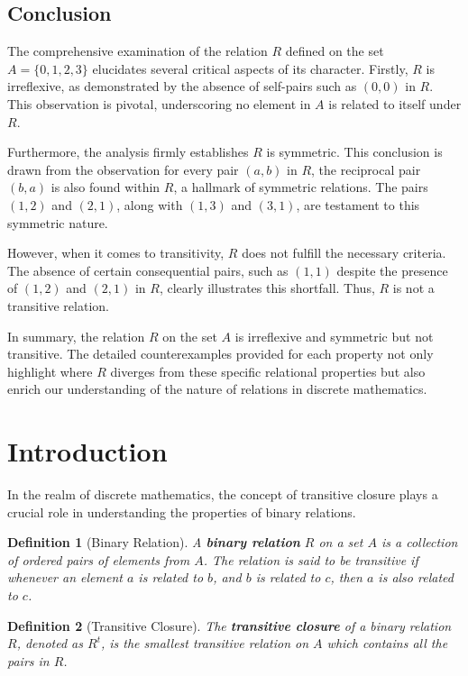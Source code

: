 \documentclass[12pt]{article}
\newtheorem{definition}{Definition}
\begin{document}
\subsection{Conclusion}
The comprehensive examination of the relation \( R \) defined on the set \( A = \{ 0, 1, 2, 3 \} \) elucidates several critical aspects of its character. Firstly, \( R \) is irreflexive, as demonstrated by the absence of self-pairs such as \( (0,0) \) in \( R \). This observation is pivotal, underscoring no element in \( A \) is related to itself under \( R \).

Furthermore, the analysis firmly establishes \( R \) is symmetric. This conclusion is drawn from the observation for every pair \( (a, b) \) in \( R \), the reciprocal pair \( (b, a) \) is also found within \( R \), a hallmark of symmetric relations. The pairs \( (1,2) \) and \( (2,1) \), along with \( (1,3) \) and \( (3,1) \), are testament to this symmetric nature.

However, when it comes to transitivity, \( R \) does not fulfill the necessary criteria. The absence of certain consequential pairs, such as \( (1,1) \) despite the presence of \( (1,2) \) and \( (2,1) \) in \( R \), clearly illustrates this shortfall. Thus, \( R \) is not a transitive relation.

In summary, the relation \( R \) on the set \( A \) is irreflexive and symmetric but not transitive. The detailed counterexamples provided for each property not only highlight where \( R \) diverges from these specific relational properties but also enrich our understanding of the nature of relations in discrete mathematics.


\section{Introduction}
In the realm of discrete mathematics, the concept of transitive closure plays a crucial role in understanding the properties of binary relations. 

\begin{definition}[Binary Relation]
A \textbf{binary relation} \( R \) on a set \( A \) is a collection of ordered pairs of elements from \( A \). The relation is said to be \textit{transitive} if whenever an element \( a \) is related to \( b \), and \( b \) is related to \( c \), then \( a \) is also related to \( c \).
\end{definition}

\begin{definition}[Transitive Closure]
The \textbf{transitive closure} of a binary relation \( R \), denoted as \( R^t \), is the smallest transitive relation on \( A \) which contains all the pairs in \( R \).
\end{definition}
\end{document}
